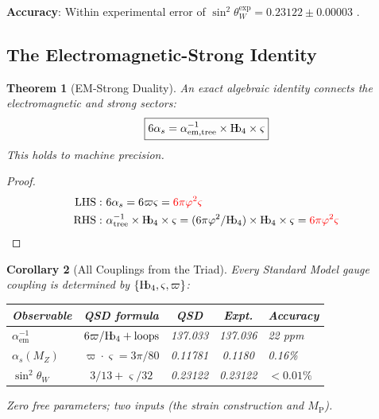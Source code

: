 \documentclass[11pt,a4paper]{article}
\newtheorem{theorem}{Theorem}[section]
\newtheorem{corollary}[theorem]{Corollary}
\theoremstyle{definition}
\newcommand{\Hb}{\textnormal{H\kern-0.3em b}}
\newcommand{\Hbfour}{\Hb_4}
\newcommand{\gs}{\varsigma}
\newcommand{\specbond}{\varpi}
\newcommand{\Mpl}{M_{\mathrm{P}}}
\begin{document}
\textbf{Accuracy}: Within experimental error of $\sin^2\theta_W^{\mathrm{exp}} = 0.23122 \pm 0.00003$ \cite{PDG2022}.

\subsection{The Electromagnetic-Strong Identity}

\begin{theorem}[EM-Strong Duality]
\label{S1:thm:em_strong}
An exact algebraic identity connects the electromagnetic and strong sectors:
\begin{equation}
\boxed{6\alpha_s = \alpha^{-1}_{\mathrm{em,tree}} \times \Hbfour \times \gs}
\label{S1:eq:em_strong}
\end{equation}
This holds to machine precision.
\end{theorem}

\begin{proof}
\begin{align}
\mathrm{LHS:\ } & 6\alpha_s = 6\specbond\gs = \color{red} 6\pi\varphi^2\gs \\
\mathrm{RHS:\ } & \alpha^{-1}_{\mathrm{tree}} \times \Hbfour \times \gs = (6\pi\varphi^2/\Hbfour) \times \Hbfour \times \gs = \color{red} 6\pi\varphi^2\gs 
\end{align}
\end{proof}

\begin{corollary}[All Couplings from the Triad]
\label{S1:cor:all_couplings}
Every Standard Model gauge coupling is determined by $\{\Hbfour, \gs, \specbond\}$:
\begin{center}
\begin{tabular}{lcccl}
\toprule
\textbf{Observable} & \textbf{QSD formula} & \textbf{QSD} & \textbf{Expt.} & \textbf{Accuracy} \\
\midrule
$\alpha^{-1}_{\mathrm{em}}$ & $6\specbond/\Hbfour + \text{loops}$ & 137.033 & 137.036 & 22 ppm \\
$\alpha_s(M_Z)$ & $\specbond \cdot \gs = 3\pi/80$ & 0.11781 & 0.1180 & 0.16\% \\
$\sin^2\theta_W$ & $3/13 + \gs/32$ & 0.23122 & 0.23122 & $< 0.01\%$ \\
\bottomrule
\end{tabular}
\end{center}
Zero free parameters; two inputs (the strain construction and $\Mpl$).
\end{corollary}
\end{document}
